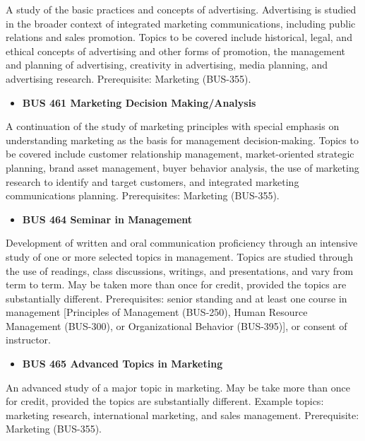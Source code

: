 \documentclass[
  letterpaper,
]{scrbook}
\providecommand{\tightlist}{%
  \setlength{\itemsep}{0pt}\setlength{\parskip}{0pt}}
\begin{document}
A study of the basic practices and concepts of advertising. Advertising
is studied in the broader context of integrated marketing
communications, including public relations and sales promotion. Topics
to be covered include historical, legal, and ethical concepts of
advertising and other forms of promotion, the management and planning of
advertising, creativity in advertising, media planning, and advertising
research. Prerequisite: Marketing (BUS-355).

\begin{itemize}
\tightlist
\item
  \textbf{BUS 461 Marketing Decision Making/Analysis}
\end{itemize}

A continuation of the study of marketing principles with special
emphasis on understanding marketing as the basis for management
decision-making. Topics to be covered include customer relationship
management, market-oriented strategic planning, brand asset management,
buyer behavior analysis, the use of marketing research to identify and
target customers, and integrated marketing communications planning.
Prerequisites: Marketing (BUS-355).

\begin{itemize}
\tightlist
\item
  \textbf{BUS 464 Seminar in Management}
\end{itemize}

Development of written and oral communication proficiency through an
intensive study of one or more selected topics in management. Topics are
studied through the use of readings, class discussions, writings, and
presentations, and vary from term to term. May be taken more than once
for credit, provided the topics are substantially different.
Prerequisites: senior standing and at least one course in management
{[}Principles of Management (BUS-250), Human Resource Management
(BUS-300), or Organizational Behavior (BUS-395){]}, or consent of
instructor.

\begin{itemize}
\tightlist
\item
  \textbf{BUS 465 Advanced Topics in Marketing}
\end{itemize}

An advanced study of a major topic in marketing. May be take more than
once for credit, provided the topics are substantially different.
Example topics: marketing research, international marketing, and sales
management. Prerequisite: Marketing (BUS-355).
\end{document}
